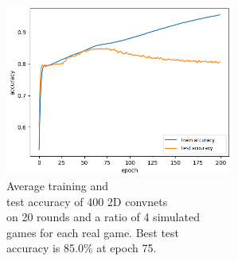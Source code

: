 \begin{minipage}{0.5\textwidth}
	\begin{figure}[H]
		\centering
		\includegraphics[width=7.5cm]{images/bestHistories/edit/2d_40s_sd4x_acc.png}
		\caption[Average training and test accuracy of 400 2D convnets on 20 rounds and a ratio of 4 simulated games for each real game.]{Average training and \\\hspace{0\textwidth}test accuracy of 400 2D convnets \\\hspace{0\textwidth}on 20 rounds and a ratio of 4 simulated \\\hspace{0\textwidth}games for each real game. Best test \\\hspace{0\textwidth}accuracy is 85.0\% at epoch 75.}
		\label{fig:2d40}
	\end{figure}
\end{minipage}


